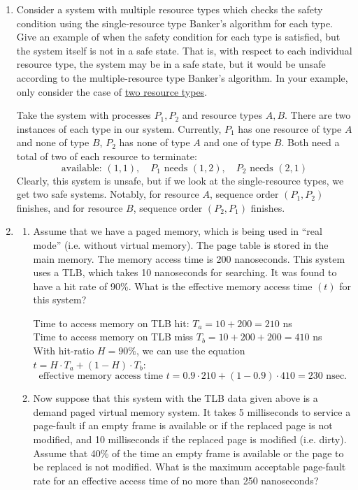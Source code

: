 \documentclass[11pt]{article}
\newcommand{\n}{\vspace{0.3cm}}
\begin{document}
\begin{enumerate}
  \item Consider a system with multiple resource types which checks the safety condition using the single-resource type Banker's algorithm for each type.  Give an example of when the safety condition for each type is satisfied, but the system itself is not in a safe state.  That is, with respect to each individual resource type, the system may be in a safe state, but it would be unsafe according to the multiple-resource type Banker's algorithm.  In your example, only consider the case of \underline{two resource types}. \n

    Take the system with processes \(P_1, P_2\) and resource types \(A, B\).  There are two instances of each type in our system.  Currently, \(P_1\) has one resource of type \(A\) and none of type \(B\), \(P_2\) has none of type \(A\) and one of type \(B\).  Both need a total of two of each resource to terminate:
    \[\text{available: } (1,1), \quad P_1 \text{ needs } (1,2), \quad P_2 \text{ needs } (2,1)\]
    Clearly, this system is unsafe, but if we look at the single-resource types, we get two safe systems.  Notably, for resource \(A\), sequence order \((P_1,P_2)\) finishes, and for resource \(B\), sequence order \((P_2,P_1)\) finishes.

  \newpage
  \item \begin{enumerate}
      \item Assume that we have a paged memory, which is being used in ``real mode'' (i.e. without virtual memory).  The page table is stored in the main memory.  The memory access time is 200 nanoseconds.  This system uses a TLB, which takes 10 nanoseconds for searching.  It was found to have a hit rate of 90\%.  What is the effective memory access time \((t)\) for this system? \n

      Time to access memory on TLB hit: \(T_a = 10 + 200 = 210\) ns \\
      Time to access memory on TLB miss \(T_b = 10 + 200 + 200 = 410\) ns \\
      With hit-ratio \(H = 90\%\), we can use the equation \(t = H \cdot T_a + (1-H) \cdot T_b\):
      \[\text{effective memory access time } t = 0.9 \cdot 210 + (1-0.9) \cdot 410 = 230 \text{ nsec.}\]

      \item Now suppose that this system with the TLB data given above is a demand paged virtual memory system.  It takes 5 milliseconds to service a page-fault if an empty frame is available or if the replaced page is not modified, and 10 milliseconds if the replaced page is modified (i.e. dirty).  Assume that 40\% of the time an empty frame is available or the page to be replaced is not modified. What is the maximum acceptable page-fault rate for an effective access time of no more than 250 nanoseconds? \n


\end{enumerate}
\end{enumerate}
\end{document}
